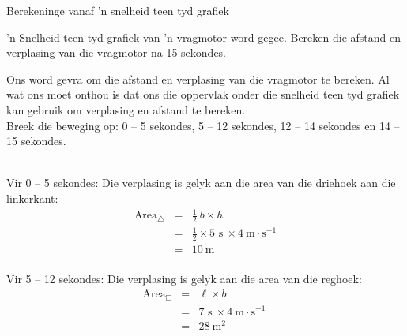     \noindent 
\begin{wex}{Berekeninge vanaf 'n snelheid teen tyd grafiek}
{'n Snelheid teen tyd grafiek van 'n vragmotor word gegee. Bereken die afstand en verplasing van die vragmotor na 15 sekondes.
\begin{center}
\end{center}}
{
Ons word gevra om die afstand en verplasing van die vragmotor te bereken. Al wat ons moet onthou is dat ons die oppervlak onder die snelheid teen tyd grafiek kan gebruik om verplasing en afstand te bereken.\\

Breek die beweging op: 0 -- 5 sekondes, 5 -- 12 sekondes, 12 -- 14 sekondes en 14 -- 15 sekondes.\\
\\
\begin{minipage}{0.4\textwidth}
Vir 0 -- 5 sekondes: Die verplasing is gelyk aan die area van die driehoek aan die linkerkant:
\begin{eqnarray*}
\text{Area}_{\triangle} &=& \frac{1}{2}~b \times h\\
&=& \frac{1}{2} \times 5\text{~s}\ \times 4 ~\text{m}\cdot \text{s}^{-1}  \\
&=&10\ \text{m}\\
\end{eqnarray*}
\end{minipage}
\begin{minipage}{0.05\textwidth}
\begin{center}
\end{center}
\end{minipage}
\begin{minipage}{0.4\textwidth}
Vir 5 -- 12 sekondes: Die verplasing is gelyk aan die area van die reghoek:\\
\begin{eqnarray*}
\text{Area}_{\Box} &=& \ell \times b\\
&=&7\text{~s}\ \times 4 ~\text{m}\cdot \text{s}^{-1}\ \\
&=&28\ \text{m}^2\\
\end{eqnarray*}
\end{minipage}

}
\end{wex}

